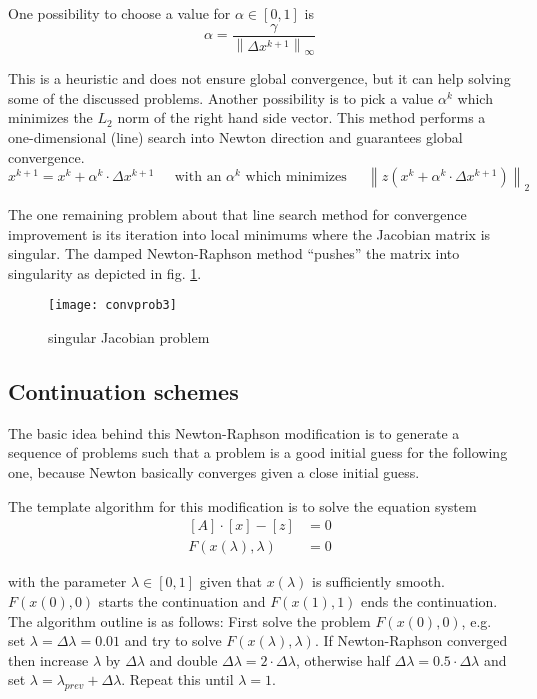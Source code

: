 One possibility to choose a value for $\alpha \in [0,1]$ is
\begin{equation}
\alpha = \dfrac{\gamma}{\left\lVert\Delta x^{k+1}\right\rVert_{\infty}}
\end{equation}

This is a heuristic and does not ensure global convergence, but it can
help solving some of the discussed problems.  Another possibility is
to pick a value $\alpha^k$ which minimizes the $L_2$ norm of the right
hand side vector.  This method performs a one-dimensional (line)
search into Newton direction and guarantees global convergence.
\begin{equation}
x^{k+1} = x^k + \alpha^k \cdot \Delta x^{k+1}
\;\;\;\; \textrm{ with an } \alpha^k \textrm{ which minimizes } \;\;\;\;
\left\lVert z\left(x^k + \alpha^k \cdot \Delta x^{k+1}\right)\right\rVert_2
\end{equation}

The one remaining problem about that line search method for
convergence improvement is its iteration into local minimums where the
Jacobian matrix is singular.  The damped Newton-Raphson method
``pushes'' the matrix into singularity as depicted in
fig. \ref{fig:ConvProb3}.
\begin{figure}[ht]
\centering
\texttt{[image: convprob3]}
\caption{singular Jacobian problem}
\label{fig:ConvProb3}
\end{figure}
\FloatBarrier

\subsection{Continuation schemes}
\label{sec:continuation}

The basic idea behind this Newton-Raphson modification is to generate
a sequence of problems such that a problem is a good initial guess for
the following one, because Newton basically converges given a close
initial guess.

\addvspace{12pt}

The template algorithm for this modification is to solve the equation
system
\begin{align}
\left[A\right] \cdot \left[x\right] - \left[z\right] &= 0\\
F\left(x\left(\lambda\right), \lambda\right) &= 0
\end{align}

with the parameter $\lambda \in [0,1]$ given that
$x\left(\lambda\right)$ is sufficiently smooth.
$F\left(x\left(0\right), 0\right)$ starts the continuation and
$F\left(x\left(1\right), 1\right)$ ends the continuation.  The
algorithm outline is as follows: First solve the problem
$F\left(x\left(0\right), 0\right)$, e.g. set $\lambda = \Delta\lambda
= 0.01$ and try to solve $F\left(x\left(\lambda\right),
\lambda\right)$.  If Newton-Raphson converged then increase $\lambda$
by $\Delta\lambda$ and double $\Delta\lambda = 2\cdot \Delta\lambda$,
otherwise half $\Delta\lambda = 0.5\cdot \Delta\lambda$ and set
$\lambda = \lambda_{prev} + \Delta\lambda$.  Repeat this until
$\lambda = 1$.

